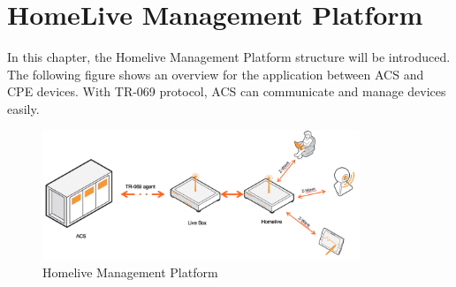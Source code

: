 
\chapter{HomeLive Management Platform} %

\label{Chapter4} %


In this chapter, the Homelive Management Platform structure will be introduced. The following figure shows an overview for the application between ACS and CPE
devices. With TR-069 protocol, ACS can communicate and manage devices easily. 
\begin{figure}[htbp]
	\centering
		\includegraphics[width=9.5cm]{Figures/Homelive_Management_Platform.png}
	\caption[Homelive Management Platform]{Homelive Management Platform}
	\label{fig:Platform}
\end{figure}


